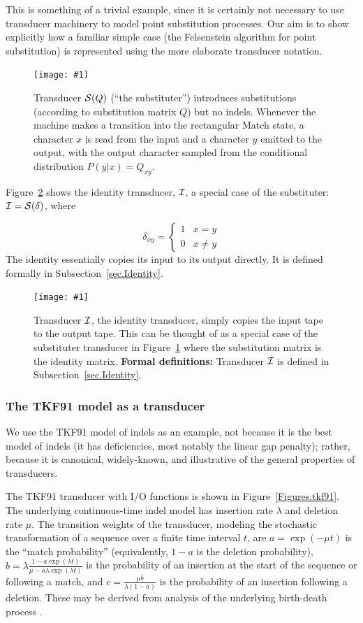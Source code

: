 \documentclass{article}
\newcommand{\secref}[1]{Subsection~\ref{sec.#1}}
\newcommand{\seclabel}[1]{\label{sec.#1}}
\newcommand{\figref}[1]{Figure~\ref{Figures.#1}}
\newcommand{\figlabel}[1]{\label{Figures.#1}}
\newcommand{\easyfig}[4]{
\begin{figure}
\texttt{[image: \#1]}
\caption{ \figlabel{#3} #4}
\end{figure}}
\newcommand{\pdffig}[2]{\easyfig{#1-fig.pdf}{}{#1}{#2}}
\newcommand\substitute{{\cal S}}
\newcommand\formaldefs{{\bf Formal definitions: }}
\newcommand\identity{{\cal I}}
\begin{document}
This is something of a trivial example, since it is certainly not necessary to use transducer machinery
to model point substitution processes. Our aim is to show explicitly how a familiar simple case
(the Felsenstein algorithm for point substitution) is represented using the more elaborate transducer notation.

\pdffig{substituter}{Transducer $\substitute(Q)$ (``the substituter'') introduces substitutions (according to substitution matrix $Q$) but no indels.  
Whenever the machine makes a transition into the rectangular Match state, a character $x$ is read from the input and a character $y$ emitted to the output,
with the output character sampled from the conditional distribution $P(y|x) = Q_{xy}$.}

\figref{identity} shows the identity transducer, $\identity$, a special case of the substituter: $\identity = \substitute(\delta)$, where

\[
\delta_{xy} = \left\{
\begin{array}{ll}
1 & x=y \\
0 & x \neq y
\end{array}
\right.
\]
The identity essentially copies its input to its output directly.
It is defined formally in \secref{Identity}. 

\pdffig{identity}{Transducer $\identity$, the identity transducer, 
simply copies the input tape to the output tape.  This can be thought of as a special case of the substituter transducer in \figref{substituter}
where the substitution matrix is the identity matrix.
\formaldefs
Transducer $\identity$ is defined in \secref{Identity}.
}


\subsubsection{The TKF91 model as a transducer}
\seclabel{tkf91}

We use the TKF91 model of indels \cite{ThorneEtal91} as an example, not because it is the best model of indels
 (it has deficiencies, most notably the linear gap penalty);
rather, because it is canonical, widely-known, and illustrative of the general properties of transducers.  

The TKF91 transducer with I/O functions is shown in \figref{tkf91}.  
The underlying continuous-time indel model has insertion rate $\lambda$ and deletion rate $\mu$.
The transition weights of the transducer,
modeling the stochastic transformation of a sequence over a finite time interval $t$,
are
$a = \exp(-\mu t)$ is the ``match probability'' (equivalently, $1-a$ is the deletion probability),
$b = \lambda\frac{1 - a \exp(\lambda t)}{\mu - a \lambda \exp(\lambda t)}$ is the probability of an insertion at the start of the sequence or following a match,
and $c = \frac{\mu b}{\lambda(1-a)}$ is the probability of an insertion following a deletion. 
These may be derived from analysis of the underlying birth-death process \cite{ThorneEtal91}.
\end{document}
